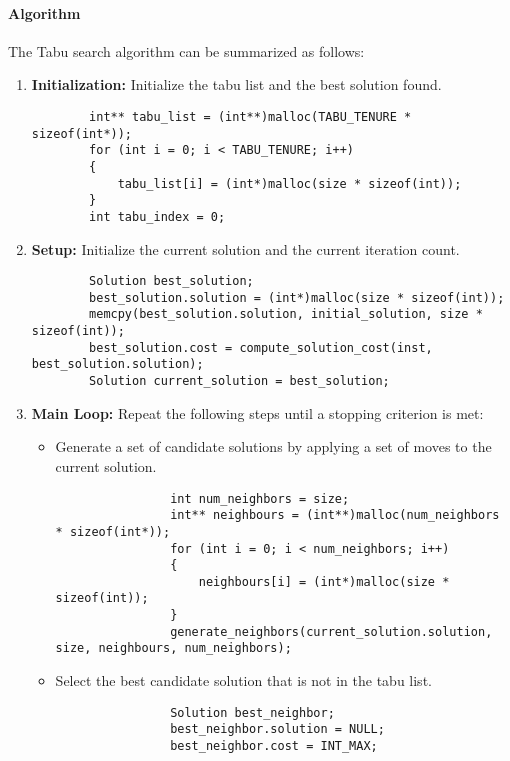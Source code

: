 \documentclass{article}
\begin{document}
\paragraph{Algorithm}
The Tabu search algorithm can be summarized as follows:
\begin{enumerate}
    \item \textbf{Initialization:} Initialize the tabu list and the best solution found.
    \begin{lstlisting}
		int** tabu_list = (int**)malloc(TABU_TENURE * sizeof(int*));
		for (int i = 0; i < TABU_TENURE; i++)
		{
			tabu_list[i] = (int*)malloc(size * sizeof(int));
		}
		int tabu_index = 0;
	\end{lstlisting}
    \item \textbf{Setup:} Initialize the current solution and the current iteration count.
    \begin{lstlisting}
		Solution best_solution;
		best_solution.solution = (int*)malloc(size * sizeof(int));
		memcpy(best_solution.solution, initial_solution, size * sizeof(int));
		best_solution.cost = compute_solution_cost(inst, best_solution.solution);
		Solution current_solution = best_solution;
	\end{lstlisting}
    \item \textbf{Main Loop:} Repeat the following steps until a stopping criterion is met:
          \begin{itemize}
              \item Generate a set of candidate solutions by applying a set of moves to the current solution.
              \begin{lstlisting}
				int num_neighbors = size;
				int** neighbours = (int**)malloc(num_neighbors * sizeof(int*));
				for (int i = 0; i < num_neighbors; i++)
				{
					neighbours[i] = (int*)malloc(size * sizeof(int));
				}
				generate_neighbors(current_solution.solution, size, neighbours, num_neighbors);
			  \end{lstlisting}
              \item Select the best candidate solution that is not in the tabu list.
              \begin{lstlisting}
				Solution best_neighbor;
				best_neighbor.solution = NULL;
				best_neighbor.cost = INT_MAX;


\end{lstlisting}
\end{itemize}
\end{enumerate}
\end{document}
